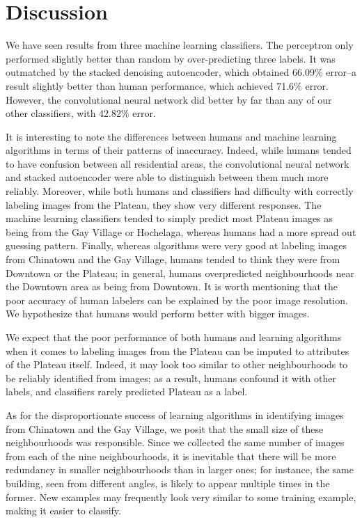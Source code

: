 \documentclass{acm_proc_article-sp}
\begin{document}
\section{Discussion}%
We have seen results from three machine learning classifiers. The perceptron only performed slightly better than random by over-predicting three labels. It was outmatched by the stacked denoising autoencoder, which obtained 66.09\% error--a result slightly better than human performance, which achieved 71.6\% error. However, the convolutional neural network did better by far than any of our other classifiers, with 42.82\% error. 

It is interesting to note the differences between humans and machine learning algorithms in terms of their patterns of inaccuracy. Indeed, while humans tended to have confusion between all residential areas, the convolutional neural network and stacked autoencoder were able to distinguish between them much more reliably.  Moreover, while both humans and classifiers had difficulty with correctly labeling images from the Plateau, they show very different responses. The machine learning classifiers tended to simply predict most Plateau images as being from the Gay Village or Hochelaga, whereas humans had a more spread out guessing pattern. Finally, whereas algorithms were very good at labeling images from Chinatown and the Gay Village, humans tended to think they were from Downtown or the Plateau; in general, humans overpredicted neighbourhoods near the Downtown area as being from Downtown. It is worth mentioning that the poor accuracy of human labelers can be explained by the poor image resolution. We hypothesize that humans would perform better with bigger images.

We expect that the poor performance of both humans and learning algorithms when it comes to labeling images from the Plateau can be imputed to attributes of the Plateau itself. Indeed, it may look too similar to other neighbourhoods to be reliably identified from images; as a result, humans confound it with other labels, and classifiers rarely predicted Plateau as a label. 

As for the disproportionate success of learning algorithms in identifying images from Chinatown and the Gay Village, we posit that the small size of these neighbourhoods was responsible. Since we collected the same number of images from each of the nine neighbourhoods, it is inevitable that there will be more redundancy in smaller neighbourhoods than in larger ones; for instance, the same building, seen from different angles, is likely to appear multiple times in the former. New examples may frequently look very similar to some training example, making it easier to classify.
\end{document}
